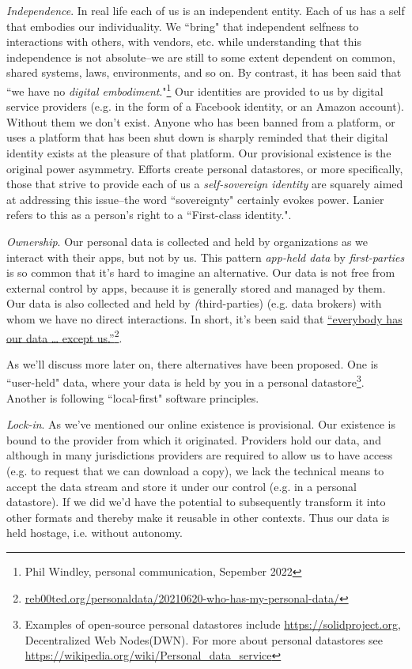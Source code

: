 \documentclass[11pt, oneside]{article}   	%
\newcommand{\hyperfootnote}[1][]{\def\ArgI{{#1}}\hyperfootnoteRelay}
\newcommand\hyperfootnoteRelay[2][]{\href{#1#2}{\ArgI}\footnote{\href{#1#2}{#2}}}
\begin{document}
\emph{Independence}. In real life each of us is an independent entity. Each of us has a self that embodies our individuality. We ``bring" that independent selfness to interactions with others, with vendors, etc. while understanding that this independence is not absolute--we are still to some extent dependent on common, shared systems, laws, environments, and so on. By contrast, it has been said that ``we have no \emph{digital embodiment}."\footnote{Phil Windley, personal communication, Sepember 2022}  Our identities are provided to us by digital service providers (e.g. in the form of a Facebook identity, or an Amazon account). Without them we don't exist. Anyone who has been banned from a platform, or uses a platform that has been shut down is sharply reminded that their digital identity exists at the pleasure of that platform. Our provisional existence is the original power asymmetry. Efforts create personal datastores, or more specifically, those that strive to provide each of us a \emph{self-sovereign identity}\cite{Preukschat2021} are squarely aimed at addressing this issue--the word ``sovereignty" certainly evokes power. Lanier refers to this as a person's right to a ``First-class identity."\cite[p251]{Lanier2014}.

\emph{Ownership}. Our personal data is collected and held by organizations as we interact with their apps, but not by us. This pattern \emph{app-held data} by \emph{first-parties} is so common that it's hard to imagine an alternative. Our data is not free from external control by apps, because it is generally stored and managed by them. Our data is also collected and held by \emph(third-parties) (e.g. data brokers) with whom we have no direct interactions. In short, it's been said that \hyperfootnote[“everybody has our data … except us.”][https://]{reb00ted.org/personaldata/20210620-who-has-my-personal-data/}. 

As we'll discuss more later on, there alternatives have been proposed. One is ``user-held" data\cite{Jurcys2021}, where your data is held by you in a personal datastore\footnote{Examples of open-source personal datastores include \url{https://solidproject.org}, Decentralized Web Nodes(DWN). For more about personal datastores see \url{https://wikipedia.org/wiki/Personal\_data\_service}}. Another is following ``local-first" software principles.\cite{Kleppmann2019}

\emph{Lock-in}. As we've mentioned our online existence is provisional. Our existence is bound to the provider from which it originated. Providers hold our data, and although in many jurisdictions providers are required to allow us to have access (e.g. to request that we can download a copy), we lack the technical means to accept the data stream and store it under our control (e.g. in a personal datastore). If we did we'd have the potential to subsequently transform it into other formats and thereby make it reusable in other contexts. Thus our data is held hostage, i.e. without autonomy. 
\end{document}
